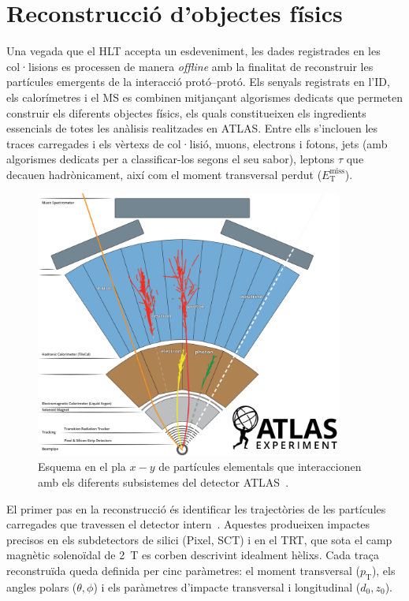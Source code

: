 \section*{Reconstrucció d’objectes físics}

Una vegada que el HLT accepta un esdeveniment, les dades registrades en les col·lisions es processen de manera \textit{offline} amb la finalitat de reconstruir les partícules emergents de la interacció protó–protó.  
Els senyals registrats en l’ID, els calorímetres i el MS es combinen mitjançant algorismes dedicats que permeten construir els diferents objectes físics, els quals constitueixen els ingredients essencials de totes les anàlisis realitzades en ATLAS.  
Entre ells s’inclouen les traces carregades i els vèrtexs de col·lisió, muons, electrons i fotons, jets (amb algorismes dedicats per a classificar-los segons el seu sabor), leptons $\tau$ que decauen hadrònicament, així com el moment transversal perdut ($E_{\mathrm{T}}^{\text{miss}}$).  

\begin{figure}[h]
  \centering
  \includegraphics[width=0.9\textwidth]{images/atlas_particles.png}
  \caption{Esquema en el pla $x-y$ de partícules elementals que interaccionen amb els diferents subsistemes del detector ATLAS~\cite{Bianchi:2837191}.}
  \label{res:reco}
 \end{figure}

El primer pas en la reconstrucció és identificar les trajectòries de les partícules carregades que travessen el detector intern~\cite{tracks}.  
Aquestes produeixen impactes precisos en els subdetectors de silici (Pixel, SCT) i en el TRT, que sota el camp magnètic solenoïdal de 2~T es corben descrivint idealment hèlixs.  
Cada traça reconstruïda queda definida per cinc paràmetres: el moment transversal ($p_{\mathrm{T}}$), els angles polars ($\theta, \phi$) i els paràmetres d’impacte transversal i longitudinal ($d_{0}, z_{0}$).  

